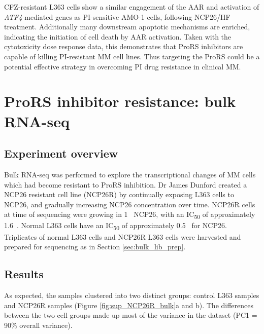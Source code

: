 CFZ-resistant L363 cells show a similar engagement of the AAR and activation of \textit{ATF4}-mediated genes as PI-sensitive AMO-1 cells, following NCP26/HF treatment.
Additionally many downstream apoptotic mechanisms are enriched, indicating the initiation of cell death by AAR activation.
Taken with the cytotoxicity dose response data, this demonstrates that ProRS inhibitors are capable of killing PI-resistant MM cell lines.
Thus targeting the ProRS could be a potential effective strategy in overcoming PI drug resistance in clinical MM\@.

\section{ProRS inhibitor resistance: bulk RNA-seq}

\subsection{Experiment overview}
Bulk RNA-seq was performed to explore the transcriptional changes of MM cells which had become resistant to ProRS inhibition.
Dr James Dunford created a NCP26 resistant cell line (NCP26R) by continually exposing L363 cells to NCP26, and gradually increasing NCP26 concentration over time.
NCP26R cells at time of sequencing were growing in 1\si{\micro\Molar} NCP26, with an IC\textsubscript{50} of approximately 1.6\si{\micro\Molar}.
Normal L363 cells have an IC\textsubscript{50} of approximately 0.5\si{\micro\Molar} for NCP26.
Triplicates of normal L363 cells and NCP26R L363 cells were harvested and prepared for sequencing as in Section \ref{sec:bulk_lib_prep}.

\subsection{Results}
As expected, the samples clustered into two distinct groups: control L363 samples and NCP26R samples (Figure \ref{fig:sup_NCP26R_bulk}a and b).
The differences between the two cell groups made up most of the variance in the dataset (PC1 = 90\% overall variance).

